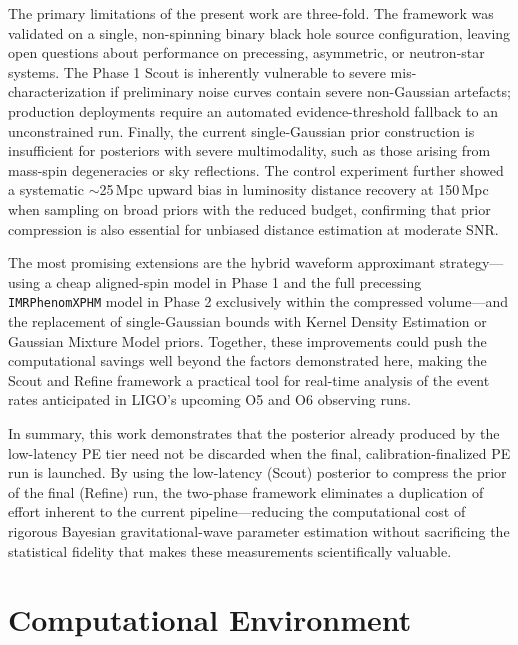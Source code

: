 \documentclass[12pt]{article}
\begin{document}
The primary limitations of the present work are three-fold. The framework was validated on a single, non-spinning binary black hole source configuration, leaving open questions about performance on precessing, asymmetric, or neutron-star systems. The Phase 1 Scout is inherently vulnerable to severe mis-characterization if preliminary noise curves contain severe non-Gaussian artefacts; production deployments require an automated evidence-threshold fallback to an unconstrained run. Finally, the current single-Gaussian prior construction is insufficient for posteriors with severe multimodality, such as those arising from mass-spin degeneracies or sky reflections. The control experiment further showed a systematic $\sim$25\,Mpc upward bias in luminosity distance recovery at 150\,Mpc when sampling on broad priors with the reduced budget, confirming that prior compression is also essential for unbiased distance estimation at moderate SNR.

The most promising extensions are the hybrid waveform approximant strategy---using a cheap aligned-spin model in Phase 1 and the full precessing \texttt{IMRPhenomXPHM} model in Phase 2 exclusively within the compressed volume---and the replacement of single-Gaussian bounds with Kernel Density Estimation or Gaussian Mixture Model priors. Together, these improvements could push the computational savings well beyond the factors demonstrated here, making the Scout and Refine framework a practical tool for real-time analysis of the event rates anticipated in LIGO's upcoming O5 and O6 observing runs.

In summary, this work demonstrates that the posterior already produced by the low-latency PE tier need not be discarded when the final, calibration-finalized PE run is launched. By using the low-latency (Scout) posterior to compress the prior of the final (Refine) run, the two-phase framework eliminates a duplication of effort inherent to the current pipeline---reducing the computational cost of rigorous Bayesian gravitational-wave parameter estimation without sacrificing the statistical fidelity that makes these measurements scientifically valuable.

\newpage
\appendix
\section{Computational Environment}
\end{document}
